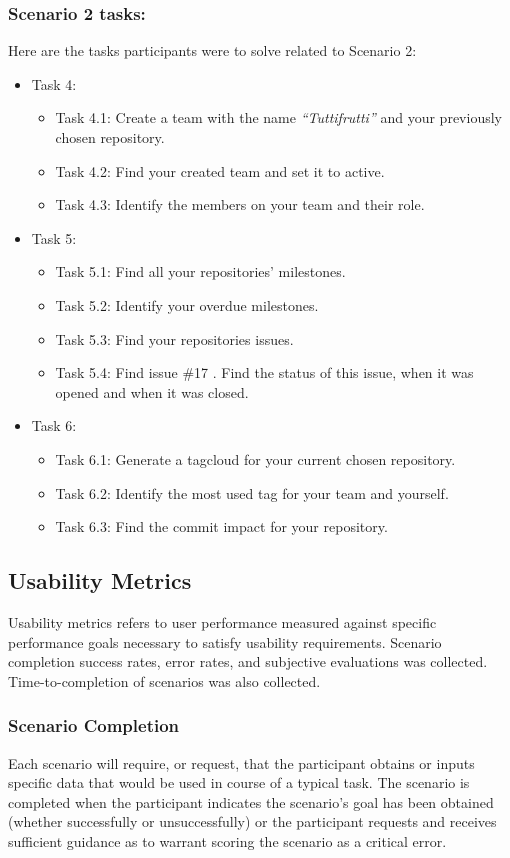 \subsubsection{Scenario 2 tasks:}
Here are the tasks participants were to solve related to Scenario 2:
\begin{itemize}
\item Task 4:
	\begin{itemize}
		\item Task 4.1: Create a team with the name \emph{“Tuttifrutti”} and your previously chosen repository.
		\item Task 4.2: Find your created team and set it to active.
		\item Task 4.3: Identify the members on your team and their role.
	\end{itemize}
\item Task 5:
	\begin{itemize}
		\item Task 5.1: Find all your repositories’ milestones.
		\item Task 5.2: Identify your overdue milestones.
		\item Task 5.3: Find your repositories issues.
		\item Task 5.4: Find issue \#17 . Find the status of this issue, when it was opened and when it was closed.
	\end{itemize}
\item Task 6:
	\begin{itemize}
		\item Task 6.1: Generate a tagcloud for your current chosen repository.
		\item Task 6.2: Identify the most used tag for your team and yourself.
		\item Task 6.3: Find the commit impact for your repository.
	\end{itemize}
\end{itemize}

\subsection{Usability Metrics}
Usability metrics refers to user performance measured against specific performance goals necessary to satisfy usability requirements. Scenario completion success rates, error rates, and subjective evaluations was collected. Time-to-completion of scenarios was also collected.

\subsubsection{Scenario Completion}
Each scenario will require, or request, that the participant obtains or inputs specific data that would be used in course of a typical task. The scenario is completed when the participant indicates the scenario's goal has been obtained (whether successfully or unsuccessfully) or the participant requests and receives sufficient guidance as to warrant scoring the scenario as a critical error.
